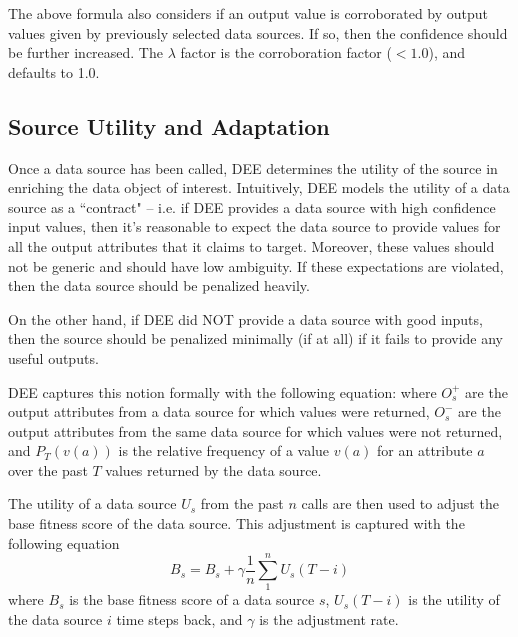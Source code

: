 \documentclass[letterpaper]{article}
\begin{document}
The above formula also considers if an output value is corroborated by output values given by previously
selected data sources. If so, then the confidence should be further increased. The $\lambda$ factor is
the corroboration factor ($< 1.0$), and defaults to 1.0.


\subsection{Source Utility and Adaptation}

Once a data source has been called, DEE determines the utility of the source in enriching the data
object of interest. Intuitively, DEE models the utility of a data source as a ``contract" -- i.e. if 
DEE provides a data source with high confidence input values, then it's reasonable to expect the data
source to provide values for all the output attributes that it claims to target. Moreover, these values 
should not be generic and should have low ambiguity. If these expectations are violated, then the data 
source should be penalized heavily. 

On the other hand, if DEE did NOT provide a data source with good inputs, then the source should
be penalized minimally (if at all) if it fails to provide any useful outputs.

DEE captures this notion formally with the following equation:
where $O_s^+$ are the output attributes from a data source for which values were returned, $O_s^-$ 
are the output attributes from the same data source for which values were not returned, and $P_T(v(a))$
is the relative frequency of a value $v(a)$ for an attribute $a$ over the past $T$ values returned 
by the data source. 

The utility of a data source $U_s$ from the past $n$ calls are then used to adjust the base fitness score 
of the data source. This adjustment is captured with the following equation
\begin{equation}
 B_s= B_s + \gamma \frac{1}{n} \displaystyle\sum\limits_{1}^{n}U_s(T - i)
\end{equation}
where $B_s$ is the base fitness score of a data source $s$, $U_s(T-i)$ is the utility of the data source $i$ time steps
back, and $\gamma$ is the adjustment rate.
\end{document}
